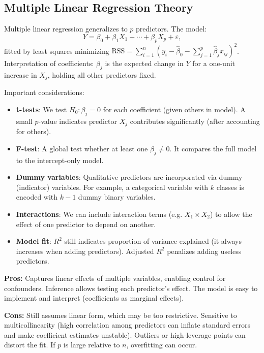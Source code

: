 \documentclass[11pt]{article}
\begin{document}
\subsection{Multiple Linear Regression Theory}
Multiple linear regression generalizes to $p$ predictors. The model:
\[ Y = \beta_0 + \beta_1 X_1 + \cdots + \beta_p X_p + \varepsilon, \]
fitted by least squares minimizing $\text{RSS} = \sum_{i=1}^n (y_i - \hat\beta_0 - \sum_{j=1}^p \hat\beta_j x_{ij})^2$. Interpretation of coefficients: $\beta_j$ is the expected change in $Y$ for a one-unit increase in $X_j$, holding all other predictors fixed.

Important considerations:
\begin{itemize}
  \item \textbf{t-tests}: We test $H_0:\beta_j=0$ for each coefficient (given others in model). A small $p$-value indicates predictor $X_j$ contributes significantly (after accounting for others).
  \item \textbf{F-test}: A global test whether at least one $\beta_j \neq 0$. It compares the full model to the intercept-only model.
  \item \textbf{Dummy variables}: Qualitative predictors are incorporated via dummy (indicator) variables. For example, a categorical variable with $k$ classes is encoded with $k-1$ dummy binary variables.
  \item \textbf{Interactions}: We can include interaction terms (e.g. $X_1 \times X_2$) to allow the effect of one predictor to depend on another.
  \item \textbf{Model fit}: $R^2$ still indicates proportion of variance explained (it always increases when adding predictors). Adjusted $R^2$ penalizes adding useless predictors.
\end{itemize}

\textbf{Pros:} Captures linear effects of multiple variables, enabling control for confounders. Inference allows testing each predictor’s effect. The model is easy to implement and interpret (coefficients as marginal effects).

\textbf{Cons:} Still assumes linear form, which may be too restrictive. Sensitive to multicollinearity (high correlation among predictors can inflate standard errors and make coefficient estimates unstable). Outliers or high-leverage points can distort the fit. If $p$ is large relative to $n$, overfitting can occur.
\end{document}
